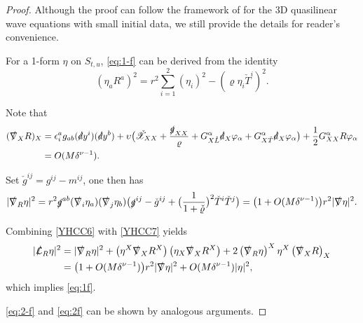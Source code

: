 \documentclass[11pt,twoside]{article}
\def\al{\alpha}
\def\vp{\varphi}
\begin{document}
\begin{proof}
Although the proof can follow the framework of \cite[Lemma 12.22]{Sp} for the 3D quasilinear wave equations with small
initial data, we still provide the details for reader's convenience.

 For a 1-form $\eta$ on $S_{t, u}$, \eqref{eq:1-f} can be derived from the identity
 \[
 (\eta_a R^a)^2 = r^2\sum_{i = 1}^2 (\eta_i)^2 - (\varrho\eta_i\check{T}^i)^2.
 \]

 Note that
 \begin{equation}\label{YHCC6}
 \begin{split}
 (\slashed{\nabla}_X R)_X &= \epsilon^a_i g_{ab}(\slashed{d}y^i)(\slashed{d}y^b)
 + \upsilon\big(\check{\mathscr{X}}_{XX} + \frac{\slashed{g}_{XX}}{\varrho}
 + G_{X\mathring{L}}^\al \slashed{d}_X \vp_\al + G_{X\tilde{T}}^\al \slashed{d}_X \vp_\al\big)
 + \frac{1}{2}G_{XX}^\al R \vp_{\al} \\
 &= O(M\delta^{\nu-1}).
 \end{split}
 \end{equation}

 Set $\check{g}^{ij} = g^{ij} - m^{ij}$, one then has
 \begin{equation}\label{YHCC7}
 \begin{split}
 |\slashed{\nabla}_R \eta|^2 = r^2\slashed{g}^{ab}(\slashed{\nabla}_i \eta_a)(\slashed{\nabla}_j \eta_b)
 \big(\slashed{g}^{ij} - \check{g}^{ij} + \big(\frac{1}{1+\check{\varrho}}\big)^2 \check{T}^i \check{T}^j\big)
 = \bigl(1 + O(M\delta^{\nu-1})\bigr)r^2|\slashed{\nabla} \eta|^2.
 \end{split}
 \end{equation}

 Combining \eqref{YHCC6} with \eqref{YHCC7} yields
 \begin{equation*}
 \begin{split}
 |\slashed{\mathcal{L}}_{R} \eta|^2 &= |\slashed{\nabla}_R \eta|^2
 + \left(\eta^X \slashed{\nabla}_X R^X\right)\left(\eta_X \slashed{\nabla}_X R^X\right)
 + 2\left(\slashed{\nabla}_R \eta\right)^X \eta^X \left(\slashed{\nabla}_X R\right)_X \\
 &= \bigl(1 + O(M\delta^{\nu-1})\bigr)r^2|\slashed{\nabla} \eta|^2 + O(M\delta^{\nu-1})|\eta|^2,
 \end{split}
 \end{equation*}
 which implies \eqref{eq:1f}.

\eqref{eq:2-f} and \eqref{eq:2f} can be shown by analogous arguments.
\end{proof}
\end{document}
